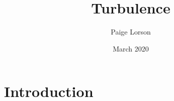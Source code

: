 \documentclass{article}
\title{Turbulence}
\author{Paige Lorson}
\date{March 2020}
\begin{document}
\maketitle

\section{Introduction}
\end{document}
